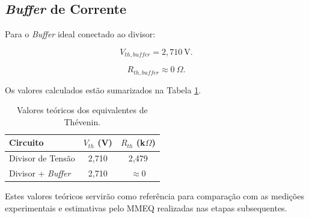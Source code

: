 \subsection{\textit{Buffer} de Corrente}

Para o \textit{Buffer} ideal conectado ao divisor:

\begin{equation}
    V_{th,buffer} = 2{,}710~\text{V}.
\end{equation}

\begin{equation}
    R_{th,buffer} \approx 0~\Omega.
\end{equation}

Os valores calculados estão sumarizados na Tabela \ref{tab:valores_teoricos}.

\begin{table}[H]
    \centering
    \ABNTEXfontereduzida
    \caption{Valores teóricos dos equivalentes de Thévenin.}
    \label{tab:valores_teoricos}
    \begin{tabular}{l|c|c}
        \hline
        \textbf{Circuito} & \textbf{$V_{th}$ (V)} & \textbf{$R_{th}$ (k$\Omega$)} \\ \hline
        Divisor de Tensão & 2,710 & 2,479 \\ [3pt]
        Divisor + \textit{Buffer} & 2,710 & $\approx 0$ \\ [3pt]
        \hline
    \end{tabular}
\end{table}

Estes valores teóricos servirão como referência para comparação com as medições experimentais e estimativas pelo MMEQ realizadas nas etapas subsequentes.